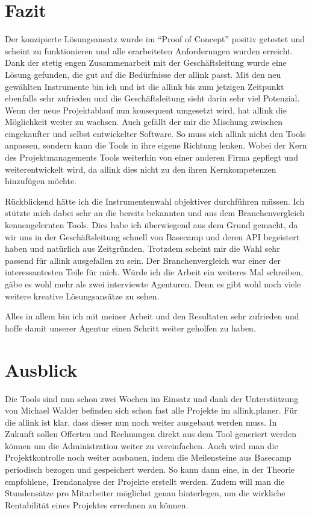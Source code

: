 \section{Fazit}
Der konzipierte Lösungsansatz wurde im ``Proof of Concept'' positiv getestet
und scheint zu funktionieren und alle erarbeiteten Anforderungen wurden erreicht. 
Dank der stetig engen Zusammenarbeit mit der Geschäftsleitung wurde eine
Lösung gefunden, die gut auf die Bedürfnisse der allink passt. Mit den neu
gewählten Instrumente bin ich und ist die allink bis zum jetzigen Zeitpunkt ebenfalls
sehr zufrieden und die Geschäftsleitung sieht darin sehr viel Potenzial.
Wenn der neue Projektablauf nun konsequent umgesetzt wird, hat allink die 
Möglichkeit weiter zu wachsen. Auch gefällt der mir die Mischung
zwischen eingekaufter und selbst entwickelter Software. So muss sich allink
nicht den Tools anpassen, sondern kann die Tools in ihre eigene Richtung 
lenken. Wobei der Kern des Projektmanagements Tools weiterhin von einer
anderen Firma gepflegt und weiterentwickelt wird, da allink dies nicht zu den
ihren Kernkompetenzen hinzufügen möchte.

Rückblickend hätte ich die Instrumentenwahl objektiver durchführen müssen.
Ich stützte mich dabei sehr an die bereits bekannten und aus dem
Branchenvergleich kennengelernten Tools. Dies habe ich überwiegend aus dem Grund
gemacht, da wir uns in der Geschäftsleitung schnell von Basecamp und deren
API begeistert haben und natürlich aus Zeitgründen. Trotzdem scheint mir die Wahl 
sehr passend für allink ausgefallen zu sein.
Der Branchenvergleich war einer der interessantesten Teile für mich.
Würde ich die Arbeit ein weiteres Mal schreiben, gäbe es wohl mehr als
zwei interviewte Agenturen. Denn es gibt wohl noch viele weitere kreative 
Lösungsansätze zu sehen.

Alles in allem bin ich mit meiner Arbeit und den Resultaten sehr
zufrieden und hoffe damit unserer Agentur einen Schritt weiter geholfen zu haben.

\section{Ausblick}
Die Tools sind nun schon zwei Wochen im Einsatz und dank der Unterstützung
von Michael Walder befinden sich schon fast alle Projekte im allink.planer.
Für die allink ist klar, dass dieser nun noch weiter ausgebaut werden muss.
In Zukunft sollen Offerten und Rechnungen direkt aus dem Tool generiert werden
können um die Administration weiter zu vereinfachen. Auch wird man die 
Projektkontrolle noch weiter ausbauen, indem die Meilensteine aus Basecamp
periodisch bezogen und gespeichert werden. So kann dann eine, in der Theorie 
empfohlene, Trendanalyse der Projekte erstellt werden. Zudem will man die
Stundensätze pro Mitarbeiter möglichst genau hinterlegen, um die wirkliche
Rentabilität eines Projektes errechnen zu können.

